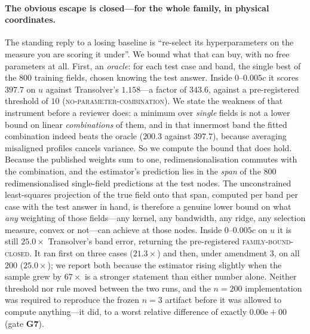 \paragraph{The obvious escape is closed---for the whole family, in physical coordinates.}
The standing
reply to a losing baseline is ``re-select its hyperparameters on the measure you are
scoring it under''. We bound what that can buy, with no free parameters at all. First, an
\emph{oracle}: for each test case and band, the single best of the $800$ training fields,
chosen knowing the test answer. Inside $0$--$0.005c$ it scores $397.7$ on $u$ against
Transolver's $1.158$---a factor of $\mathbf{343.6}$, against a pre-registered threshold of
$10$ (\textsc{no-parameter-combination}). We state the weakness of that instrument before a
reviewer does: a minimum over \emph{single} fields is not a lower bound on linear
\emph{combinations} of them, and in that innermost band the fitted combination indeed beats
the oracle ($200.3$ against $397.7$), because averaging misaligned profiles cancels
variance. So we compute the bound that does hold. Because the published weights sum to one,
redimensionalisation commutes with the combination, and the estimator's prediction lies in
the \emph{span} of the $800$ redimensionalised single-field predictions at the test nodes.
The unconstrained least-squares projection of the true field onto that span, computed per
band per case with the test answer in hand, is therefore a genuine lower bound on what
\emph{any} weighting of those fields---any kernel, any bandwidth, any ridge, any selection
measure, convex or not---can achieve at those nodes. Inside $0$--$0.005c$ on $u$ it is
still $\mathbf{25.0\times}$ Transolver's band error, returning the pre-registered
\textsc{family-bound-closed}. It ran first on three cases ($21.3\times$) and then, under
amendment 3, on all $200$ ($25.0\times$); we report both because the estimator rising
slightly when the sample grew by $67\times$ is a stronger statement than either number
alone. Neither threshold nor rule moved between the two runs, and the $n=200$
implementation was required to reproduce the frozen $n=3$ artifact before it was allowed
to compute anything---it did, to a worst relative difference of exactly
$0.00\mathrm{e}{+}00$ (gate \textbf{G7}).


